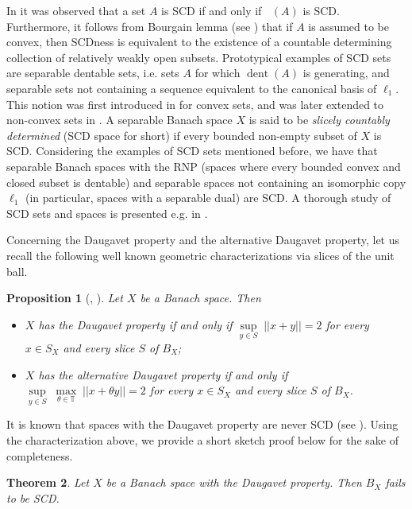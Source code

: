 \documentclass[11pt,a4paper,reqno]{amsart}
\numberwithin{equation}{section}
\DeclareMathOperator{\dent}{dent}
\DeclareMathOperator{\cconv}{\overline{conv}}
\newcommand{\1}{\mathbbm{1}}
\theoremstyle{plain}
\newtheorem{theorem}{Theorem}[section]
\newtheorem{proposition}[theorem]{Proposition}
\theoremstyle{definition}
\begin{document}
In \cite[Remark~2.7]{AKMMS10} \cite[Proposition~7.20]{KMMP} it was observed that a set $A$ is SCD if and only if $\cconv(A)$ is SCD. Furthermore, it follows from Bourgain lemma (see \cite[Lemma~II.1]{GGMS}) that if $A$ is assumed to be convex, then SCDness is equivalent to the existence of a countable determining collection of relatively weakly open subsets. Prototypical examples of SCD sets are separable dentable sets, i.e. sets $A$ for which $\dent(A)$ is generating, and separable sets not containing a sequence equivalent to the canonical basis of $\ell_1$. This notion was first introduced in \cite{AKMMS10} for convex sets, and was later extended to non-convex sets in \cite{KPW18}. A separable Banach space $X$ is said to be \emph{slicely countably determined} (SCD space for short) if every bounded non-empty subset of $X$ is SCD. Considering the examples of SCD sets mentioned before, we have that separable Banach spaces with the RNP (spaces where every bounded convex and closed subset is dentable) and separable spaces not containing an isomorphic copy $\ell_1$ (in particular, spaces with a separable dual) are SCD. A thorough study of SCD sets and spaces is presented e.g. in \cite[Chapter~10]{KMRZW25}.

Concerning the Daugavet property and the alternative Daugavet property, let us recall the following well known geometric characterizations via slices of the unit ball. 
\begin{proposition}[\cite{KSSW00}, \cite{MT04}]\label{prop:DP_and_ADP_slice_characterization}
    Let $X$ be a Banach space. Then
    \begin{itemize}
        \item $X$ has the Daugavet property if and only if $\underset{y\in S}{\sup}\;||x+y||=2$ for every $x\in S_X$ and every slice $S$ of $B_X$;
        \item $X$ has the alternative Daugavet property if and only if $\underset{y\in S}{\sup}\;\underset{\theta\in \mathbb{T}}{\max}\;||x+\theta y||=2$ for every $x\in S_X$ and every slice $S$ of $B_X$.
    \end{itemize}
\end{proposition}

It is known that spaces with the Daugavet property are never SCD (see \cite[Example~2.13]{AKMMS10}). Using the characterization above, we provide a short sketch proof below for the sake of completeness.

\begin{theorem}\label{thm:Daugavet_unit_balls_are_not_SCD}
    Let $X$ be a Banach space with the Daugavet property. Then $B_X$ fails to be SCD. 
\end{theorem}
\end{document}
